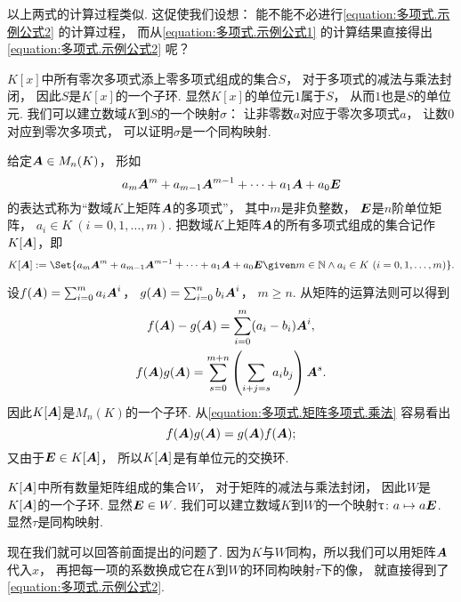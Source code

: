 以上两式的计算过程类似.
这促使我们设想：
能不能不必进行\cref{equation:多项式.示例公式2} 的计算过程，
而从\cref{equation:多项式.示例公式1}
的计算结果直接得出\cref{equation:多项式.示例公式2} 呢？

\(K[x]\)中所有零次多项式添上零多项式组成的集合\(S\)，
对于多项式的减法与乘法封闭，
因此\(S\)是\(K[x]\)的一个子环.
显然\(K[x]\)的单位元\(1\)属于\(S\)，
从而\(1\)也是\(S\)的单位元.
我们可以建立数域\(K\)到\(S\)的一个映射\(\sigma\)：
让非零数\(a\)对应于零次多项式\(a\)，
让数\(0\)对应到零次多项式，
可以证明\(\sigma\)是一个同构映射.

给定\(\boldsymbol{A}\in M_n(K)\)，
形如\begin{equation*}
	a_m \boldsymbol{A}^m + a_{m-1} \boldsymbol{A}^{m-1} + \dotsb + a_1 \boldsymbol{A} + a_0 \boldsymbol{E}
\end{equation*}的表达式称为“数域\(K\)上矩阵\(\boldsymbol{A}\)的多项式”，
其中\(m\)是非负整数，
\(\boldsymbol{E}\)是\(n\)阶单位矩阵，
\(a_i \in K\ (i=0,1,\dotsc,m)\).
把数域\(K\)上矩阵\(\boldsymbol{A}\)的所有多项式组成的集合记作\(K[\boldsymbol{A}]\)，即\begin{equation*}
	K[\vb{A}]
	\defeq
	\Set{
		a_m \vb{A}^m + a_{m-1} \vb{A}^{m-1} + \dotsb + a_1 \vb{A} + a_0 \vb{E}
		\given
		m \in \mathbb{N}
		\land
		a_i \in K\ (i=0,1,\dotsc,m)
	}.
\end{equation*}

设\(f(\boldsymbol{A})=\sum_{i=0}^m a_i \boldsymbol{A}^i\)，
\(g(\boldsymbol{A})=\sum_{i=0}^n b_i \boldsymbol{A}^i\)，
\(m \geq n\).
从矩阵的运算法则可以得到
\begin{gather}
	f(\boldsymbol{A})-g(\boldsymbol{A})
	= \sum_{i=0}^m (a_i - b_i) \boldsymbol{A}^i, \\
	f(\boldsymbol{A}) g(\boldsymbol{A})
	= \sum_{s=0}^{m+n} \left( \sum_{i+j=s} a_i b_j \right) \boldsymbol{A}^s.
	\label{equation:多项式.矩阵多项式.乘法}
\end{gather}
因此\(K[\boldsymbol{A}]\)是\(M_n(K)\)的一个子环.
从\cref{equation:多项式.矩阵多项式.乘法} 容易看出\begin{equation*}
	f(\boldsymbol{A}) g(\boldsymbol{A}) = g(\boldsymbol{A}) f(\boldsymbol{A});
\end{equation*}
又由于\(\boldsymbol{E} \in K[\boldsymbol{A}]\)，
所以\(K[\boldsymbol{A}]\)是有单位元的交换环.

\(K[\boldsymbol{A}]\)中所有数量矩阵组成的集合\(W\)，
对于矩阵的减法与乘法封闭，
因此\(W\)是\(K[\boldsymbol{A}]\)的一个子环.
显然\(\boldsymbol{E} \in W\).
我们可以建立数域\(K\)到\(W\)的一个映射\(\uptau\colon a \mapsto a \boldsymbol{E}\).
显然\(\tau\)是同构映射.

现在我们就可以回答前面提出的问题了.
因为\(K\)与\(W\)同构，所以我们可以用矩阵\(\boldsymbol{A}\)代入\(x\)，
再把每一项的系数换成它在\(K\)到\(W\)的环同构映射\(\tau\)下的像，
就直接得到了\cref{equation:多项式.示例公式2}.

